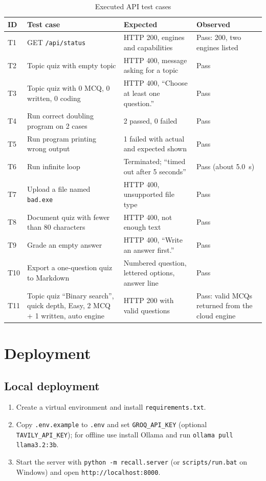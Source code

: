 \begin{table}[H]
\centering
\small
\begin{tabularx}{\textwidth}{@{} p{0.9cm} p{4.6cm} p{4.4cm} X @{}}
\toprule
\textbf{ID} & \textbf{Test case} & \textbf{Expected} & \textbf{Observed} \\
\midrule
T1 & GET \texttt{/api/status} & HTTP 200, engines and capabilities & Pass: 200, two engines listed \\
T2 & Topic quiz with empty topic & HTTP 400, message asking for a topic & Pass \\
T3 & Topic quiz with 0 MCQ, 0 written, 0 coding & HTTP 400, ``Choose at least one question.'' & Pass \\
T4 & Run correct doubling program on 2 cases & 2 passed, 0 failed & Pass \\
T5 & Run program printing wrong output & 1 failed with actual and expected shown & Pass \\
T6 & Run infinite loop & Terminated; ``timed out after 5 seconds'' & Pass (about 5.0~s) \\
T7 & Upload a file named \texttt{bad.exe} & HTTP 400, unsupported file type & Pass \\
T8 & Document quiz with fewer than 80 characters & HTTP 400, not enough text & Pass \\
T9 & Grade an empty answer & HTTP 400, ``Write an answer first.'' & Pass \\
T10 & Export a one-question quiz to Markdown & Numbered question, lettered options, answer line & Pass \\
T11 & Topic quiz ``Binary search'', quick depth, Easy, 2 MCQ + 1 written, auto engine & HTTP 200 with valid questions & Pass: valid MCQs returned from the cloud engine \\
\bottomrule
\end{tabularx}
\caption{Executed API test cases}
\label{tab:tests}
\end{table}

\section{Deployment}
\subsection{Local deployment}
\begin{enumerate}
\item Create a virtual environment and install \texttt{requirements.txt}.
\item Copy \texttt{.env.example} to \texttt{.env} and set \texttt{GROQ\_API\_KEY} (optional \texttt{TAVILY\_API\_KEY}); for offline use install Ollama and run \texttt{ollama pull llama3.2:3b}.
\item Start the server with \texttt{python -m recall.server} (or \texttt{scripts/run.bat} on Windows) and open \texttt{http://localhost:8000}.
\end{enumerate}

